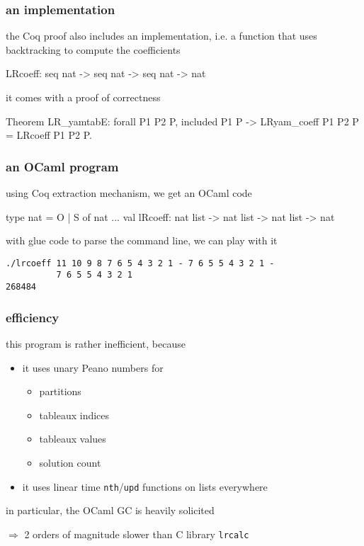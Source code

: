 \documentclass{beamer}
\let\emph\alert
\begin{document}
\begin{frame}[fragile]\frametitle{an implementation}
  the Coq proof also includes an \emph{implementation},
  i.e. a function that uses backtracking to compute the coefficients
\begin{coq}
LRcoeff: seq nat -> seq nat -> seq nat -> nat
\end{coq}

\bigskip
it comes with a proof of correctness
\begin{coq}
Theorem LR_yamtabE:
  forall P1 P2 P, included P1 P ->
  LRyam_coeff P1 P2 P = LRcoeff P1 P2 P.
\end{coq}
\end{frame}

\begin{frame}[fragile]\frametitle{an OCaml program}
using Coq extraction mechanism, we get an OCaml code
\begin{ocaml}
type nat = O | S of nat
...
val lRcoeff: nat list -> nat list -> nat list -> nat
\end{ocaml}

\bigskip
with glue code to parse the command line, we can play with it
\begin{verbatim}
./lrcoeff 11 10 9 8 7 6 5 4 3 2 1 - 7 6 5 5 4 3 2 1 -
          7 6 5 5 4 3 2 1
268484
\end{verbatim}
\end{frame}

\begin{frame}\frametitle{efficiency}
  this program is rather inefficient, because
  \begin{itemize}
  \item it uses \emph{unary Peano numbers} for
    \begin{itemize}
    \item partitions
    \item tableaux indices
    \item tableaux values
    \item solution count
    \end{itemize}
  \item it uses \emph{linear time} \texttt{nth}/\texttt{upd} functions on lists
    everywhere
  \end{itemize}

  \bigskip
  in particular, the OCaml GC is heavily solicited


  \bigskip
  $\Rightarrow$ 2 orders of magnitude slower than C library \texttt{lrcalc}
\end{frame}
\end{document}
